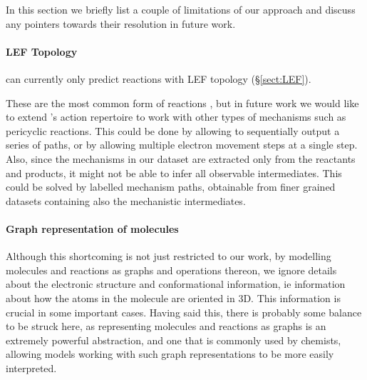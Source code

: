 
In this section we briefly list a couple of limitations of our approach and discuss any pointers towards their resolution in future work.

\paragraph{LEF Topology}

\ourModel can currently only predict reactions with LEF topology (\S \ref{sect:LEF}). 

These are the most common form of reactions \citep{herges1994organizing}, but in future work we would like to extend \ourModel's action repertoire to work with other types of mechanisms such as pericyclic reactions.
 This could be done by allowing \ourModel to sequentially output a series of paths, or by allowing multiple electron movement steps at a single step. 
 Also, since the mechanisms in our dataset are extracted only from the reactants and products, it might not be able to infer all observable intermediates. This could be solved by labelled mechanism paths, obtainable from finer grained datasets containing also the mechanistic intermediates. 
 
 \paragraph{Graph representation of molecules}

 Although this shortcoming is not just restricted to our work, by modelling molecules and reactions as graphs and operations thereon, we ignore details about the electronic structure and conformational information, ie information about how the atoms in the molecule are oriented in 3D. 
 This information is crucial in some important cases.
 Having said this, there is probably some balance to be struck here, as representing molecules and reactions as graphs is an extremely powerful abstraction, and one that is commonly used by chemists, allowing models working with such graph representations to be more easily interpreted.


 
 
